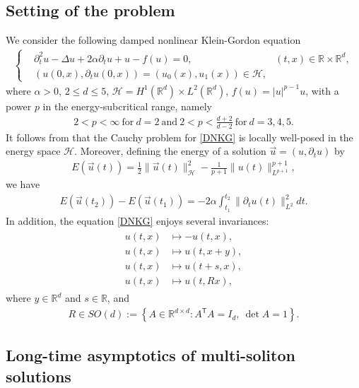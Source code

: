 \documentclass[10pt,a4paper]{amsart}
\numberwithin{equation}{section}
\renewcommand{\r}{\right}
\begin{document}
\subsection{Setting of the problem}
We consider the following damped nonlinear Klein-Gordon equation
\begin{align}
\label{DNKG}
\tag{DNKG}
	\left\{
	\begin{aligned}
		&\partial_{t}^2u-\Delta u+2\alpha \partial_{t}u+u-f(u)=0, & (t,x) \in \mathbb{R} \times \mathbb{R}^d,
		\\
		&\left(u(0,x),{\partial}_tu(0,x)\right)=\left(u_{0}(x), u_1(x)\right)\in \mathcal{H},
	\end{aligned}
	\r.
\end{align}
where $\alpha>0$, $2\leq d\leq 5$,  $\mathcal{H}=H^1(\mathbb{R}^d)\times L^2(\mathbb{R}^d)$, $f(u)=|u|^{p-1}u$, with a power $p$ in  the energy-subcritical range, namely
\begin{align*}
2<p<\infty \ \mbox{for}\ d=2\ \mbox{and}\ 2<p<\frac{d+2}{d-2}\ \mbox{for}\ d=3,4,5.
\end{align*}
It follows from \cite{BRS} that the Cauchy problem for \eqref{DNKG} is locally well-posed in the energy space $\mathcal{H}$. Moreover, defining the energy of a solution $\vec{u}=(u, {\partial}_tu)$ by
\begin{align*}
E(\vec{u}(t))=\frac{1}{2}\|\vec{u}(t)\|_{\mathcal{H}}^2-\frac{1}{p+1}\| u(t)\|_{L^{p+1}}^{p+1},
\end{align*}
we have
\begin{align}\label{energydecay}
E(\vec{u}(t_2))-E(\vec{u}(t_1))=-2\alpha \int_{t_1}^{t_2} \| {\partial}_tu(t)\|_{L^2}^2dt.
\end{align}
In addition, the equation \eqref{DNKG} enjoys several invariances:
\begin{align}\label{invariance}
\begin{aligned}
u(t,x)&\mapsto -u(t,x),
\\
u(t,x)&\mapsto u(t,x+y),
\\
u(t,x)&\mapsto u(t+s,x),
\\
u(t,x)&\mapsto u(t,Rx),
\end{aligned}
\end{align}
where $y\in \mathbb{R}^d$ and $s\in \mathbb{R}$, and 
\begin{align*}
R\in SO(d):=\left\{A\in\mathbb{R}^{d\times d}:A^{\mathsf T}A=I_d,\ \det A=1\right\}.
\end{align*}


\subsection{Long-time asymptotics of multi-soliton solutions}
\end{document}
